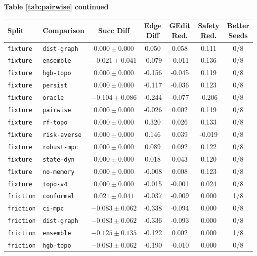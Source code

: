 \documentclass{article}
\begin{document}
\begin{center}
\textbf{Table \ref{tab:pairwise} continued}\\[0.4ex]
\begin{tabular}{llccccc}
\toprule
Split & Comparison & Succ Diff & Edge Diff & GEdit Red. & Safety Red. & Better Seeds \\
\midrule
\texttt{fixture} & \texttt{dist-graph} & $0.000 \pm 0.000$ & 0.050 & 0.058 & 0.111 & 0/8 \\
\texttt{fixture} & \texttt{ensemble} & $-0.021 \pm 0.041$ & -0.079 & -0.011 & 0.136 & 0/8 \\
\texttt{fixture} & \texttt{hgb-topo} & $0.000 \pm 0.000$ & -0.156 & -0.045 & 0.119 & 0/8 \\
\texttt{fixture} & \texttt{persist} & $0.000 \pm 0.000$ & -0.117 & -0.036 & 0.123 & 0/8 \\
\texttt{fixture} & \texttt{oracle} & $-0.104 \pm 0.086$ & -0.244 & -0.077 & -0.206 & 0/8 \\
\texttt{fixture} & \texttt{pairwise} & $0.000 \pm 0.000$ & -0.026 & 0.002 & 0.119 & 0/8 \\
\texttt{fixture} & \texttt{rf-topo} & $0.000 \pm 0.000$ & 0.320 & 0.026 & 0.133 & 0/8 \\
\texttt{fixture} & \texttt{risk-averse} & $0.000 \pm 0.000$ & 0.146 & 0.039 & -0.019 & 0/8 \\
\texttt{fixture} & \texttt{robust-mpc} & $0.000 \pm 0.000$ & 0.089 & 0.092 & 0.122 & 0/8 \\
\texttt{fixture} & \texttt{state-dyn} & $0.000 \pm 0.000$ & 0.018 & 0.043 & 0.120 & 0/8 \\
\texttt{fixture} & \texttt{no-memory} & $0.000 \pm 0.000$ & -0.008 & 0.008 & 0.123 & 0/8 \\
\texttt{fixture} & \texttt{topo-v4} & $0.000 \pm 0.000$ & -0.015 & -0.001 & 0.024 & 0/8 \\
\texttt{friction} & \texttt{conformal} & $0.021 \pm 0.041$ & -0.037 & -0.009 & 0.000 & 1/8 \\
\texttt{friction} & \texttt{ci-mpc} & $-0.083 \pm 0.062$ & -0.338 & -0.094 & 0.000 & 0/8 \\
\texttt{friction} & \texttt{dist-graph} & $-0.083 \pm 0.062$ & -0.336 & -0.093 & 0.000 & 0/8 \\
\texttt{friction} & \texttt{ensemble} & $-0.125 \pm 0.135$ & -0.122 & 0.002 & 0.000 & 1/8 \\
\texttt{friction} & \texttt{hgb-topo} & $-0.083 \pm 0.062$ & -0.190 & -0.010 & 0.000 & 0/8 \\

\end{tabular}
\end{center}
\end{document}
